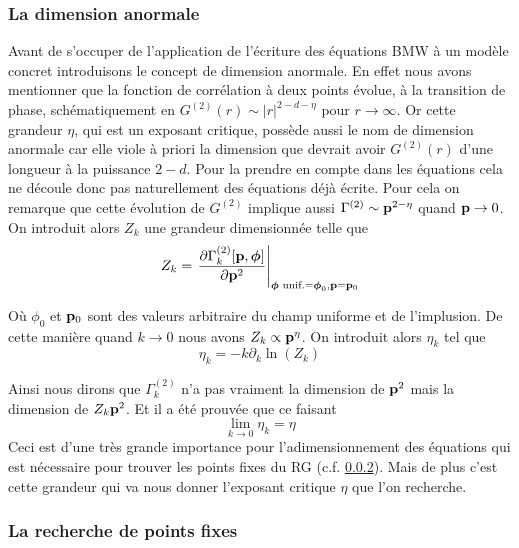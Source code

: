 \documentclass[10pt]{article}
\begin{document}
\begin{multicols}{2}
\vspace*{11pt}
\subsubsection{La dimension anormale}

Avant de s'occuper de l'application de l'écriture des équations BMW à un modèle concret introduisons le concept de dimension anormale. En effet nous avons mentionner que la fonction de corrélation à deux points évolue, à la transition de phase, schématiquement en $G^{(2)}(r) \sim |r|^{2-d-\eta}$ pour $r \to \infty$. Or cette grandeur $\eta$, qui est un exposant critique, possède aussi le nom de dimension anormale car elle viole à priori la dimension que devrait avoir $G^{(2)}(r)$ d'une longueur à la puissance $2-d$. Pour la prendre en compte dans les équations cela ne découle donc pas naturellement des équations déjà écrite. Pour cela on remarque que cette évolution de $G^{(2)}$ implique aussi $\Gamma^{(2)} \sim {\bf p}^{2-\eta}$ quand ${\bf p} \to 0$. On introduit alors $Z_k$ une grandeur dimensionnée telle que
\begin{equation}
	Z_k = {\left. \frac{\partial \Gamma_k^{(2)}[{\bf p}, \boldsymbol{ \phi}]}{\partial {\bf p}^2} \right|}_{\boldsymbol{ \phi} \text{ unif.} = \boldsymbol{ \phi}_0, {\bf p} = {\bf p}_0 }
\end{equation}

Où $\phi_0$ et ${\bf p}_0$ sont des valeurs arbitraire du champ uniforme et de l'implusion. De cette manière  quand $k \to 0$ nous avons $Z_k \propto {\bf p}^\eta$.
On introduit alors $\eta_k$ tel que
\begin{equation}
	\eta_k = -k \partial_k \ln(Z_k)
\end{equation}

Ainsi nous dirons que $\Gamma^{(2)}_k$ n'a pas vraiment la dimension de ${\bf p}^2$ mais la dimension de $Z_k{\bf p}^2$. Et il a été prouvée\cite{} que ce faisant 
\begin{equation}
 	\lim\limits_{k \to 0} \eta_k  = \eta
 \end{equation}
Ceci est d'une très grande importance pour l'adimensionnement des équations qui est nécessaire pour trouver les points fixes du RG (c.f. \ref{}). Mais de plus c'est cette grandeur qui va nous donner l'exposant critique $\eta$ que l'on recherche.


\vspace*{11pt}
\subsubsection{La recherche de points fixes}


\end{multicols}
\end{document}

